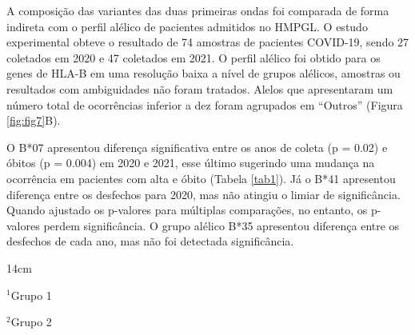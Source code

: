\begin{justifying}
A composição das variantes das duas primeiras ondas foi comparada de forma indireta com o perfil alélico de pacientes admitidos no HMPGL. O estudo experimental obteve o resultado de 74 amostras de pacientes COVID-19, sendo 27 coletados em 2020 e 47 coletados em 2021. O perfil alélico foi obtido para os genes de HLA-B em uma resolução baixa a nível de grupos alélicos, amostras ou resultados com ambiguidades não foram tratados. Alelos que apresentaram um número total de ocorrências inferior a dez foram agrupados em ``Outros'' (Figura \ref{fig:fig7}B).

O B*07 apresentou diferença significativa entre os anos de coleta (p = 0.02) e óbitos (p = 0.004) em 2020 e 2021, esse último sugerindo uma mudança na ocorrência em pacientes com alta e óbito (Tabela \ref{tab1}). Já o B*41 apresentou diferença entre os desfechos para 2020, mas não atingiu o limiar de significância. Quando ajustado os p-valores para múltiplas comparações, no entanto, os p-valores perdem significância. O grupo alélico B*35 apresentou diferença entre os desfechos de cada ano, mas não foi detectada significância. 

\begin{table}[!h]{14cm}
\caption{Comparações entre as Frequências dos Grupos Alélicos.}\label{tab1}
        \begin{tablenotes}\footnotesize
         \raggedright
            \item \scriptsize\textit{$^1$}Grupo 1 
            \item \scriptsize\textit{$^2$}Grupo 2
            \par
        \end{tablenotes}
\end{table}


\end{justifying}
